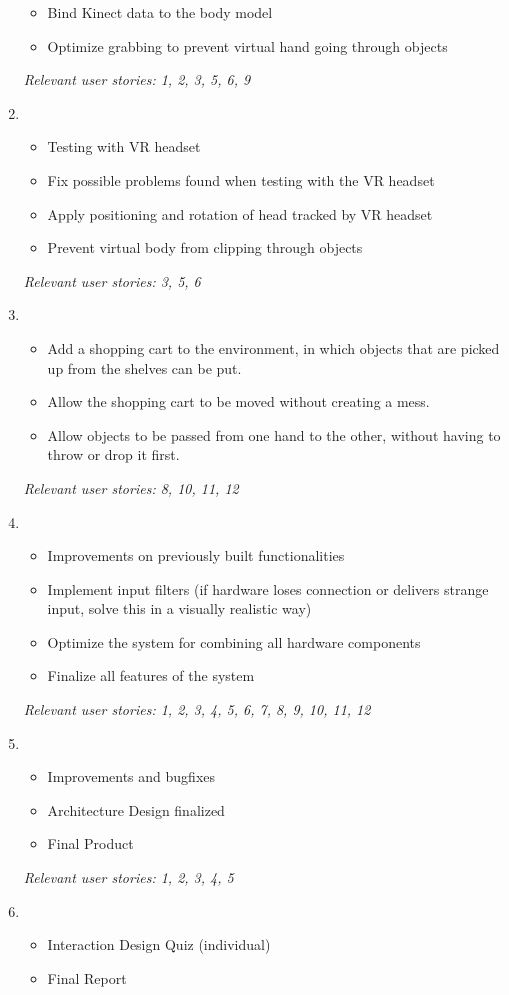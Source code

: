 \documentclass[11pt,a4paper]{report}
\begin{document}
\begin{enumerate}[label=\large{ \textbf{Sprint \arabic*}},leftmargin=3\parindent]
\begin{itemize}
\item Bind Kinect data to the body model
\item Optimize grabbing to prevent virtual hand going through objects
\end{itemize}
\textit{Relevant user stories: 1, 2, 3, 5, 6, 9 }
\item 
\begin{itemize}
\item Testing with VR headset
\item Fix possible problems found when testing with the VR headset
\item Apply positioning and rotation of head tracked by VR headset
\item Prevent virtual body from clipping through objects
\end{itemize}
\textit{Relevant user stories: 3, 5, 6 }
\item 
\begin{itemize}
\item Add a shopping cart to the environment, in which objects that are picked up from the shelves can be put.
\item Allow the shopping cart to be moved without creating a mess.
\item Allow objects to be passed from one hand to the other, without having to throw or drop it first.
\end{itemize}
\textit{Relevant user stories: 8, 10, 11, 12 }
\item 
\begin{itemize}
\item Improvements on previously built functionalities	
\item Implement input filters (if hardware loses connection or delivers strange input, solve this in a
visually realistic way)
\item Optimize the system for combining all hardware components
\item Finalize all features of the system
\end{itemize}
\textit{Relevant user stories: 1, 2, 3, 4, 5, 6, 7, 8, 9, 10, 11, 12 }
\item 
\begin{itemize}
\item Improvements and bugfixes
\item Architecture Design finalized
\item Final Product
\end{itemize}
\textit{Relevant user stories: 1, 2, 3, 4, 5 }
\item 
\begin{itemize}
\item Interaction Design Quiz (individual)
\item Final Report
\end{itemize}
\end{enumerate}
\end{document}
